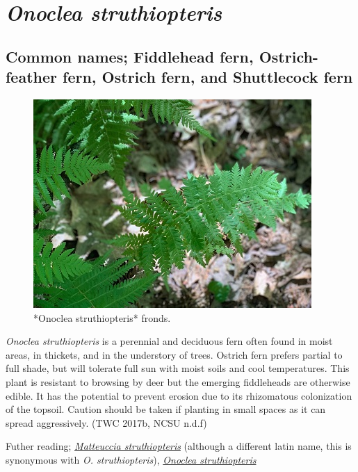 \documentclass[
]{article}
\begin{document}
\hypertarget{onoclea-struthiopteris}{%
\section{\texorpdfstring{\emph{Onoclea struthiopteris}}{Onoclea struthiopteris}}\label{onoclea-struthiopteris}}

\hypertarget{common-names-fiddlehead-fern-ostrich-feather-fern-ostrich-fern-and-shuttlecock-fern}{%
\subsection{Common names; Fiddlehead fern, Ostrich-feather fern, Ostrich fern, and Shuttlecock fern}\label{common-names-fiddlehead-fern-ostrich-feather-fern-ostrich-fern-and-shuttlecock-fern}}

\begin{figure}

{\centering \includegraphics[width=0.5\linewidth]{fern} 

}

\caption{*Onoclea struthiopteris* fronds.}\label{fig:shutfern}
\end{figure}

\emph{Onoclea struthiopteris} is a perennial and deciduous fern often found in moist areas, in thickets, and in the understory of trees. Ostrich fern prefers partial to full shade, but will tolerate full sun with moist soils and cool temperatures. This plant is resistant to browsing by deer but the emerging fiddleheads are otherwise edible. It has the potential to prevent erosion due to its rhizomatous colonization of the topsoil. Caution should be taken if planting in small spaces as it can spread aggressively. (TWC 2017b, NCSU n.d.f)

Futher reading; \href{https://www.wildflower.org/plants/result.php?id_plant=MAST}{\emph{Matteuccia struthiopteris}} (although a different latin name, this is synonymous with \emph{O. struthiopteris}),
\href{https://plants.ces.ncsu.edu/plants/onoclea-struthiopteris/}{\emph{Onoclea struthiopteris}}
\end{document}
